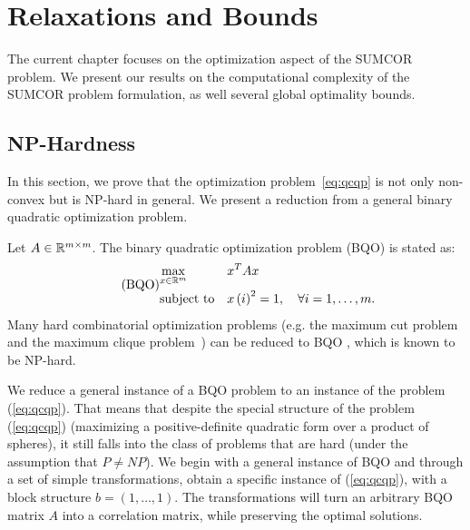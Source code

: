 %
\chapter{Relaxations and Bounds}\label{chap:relaxations}
The current chapter focuses on the optimization aspect of the SUMCOR problem.
We present our results on the computational complexity of the 
SUMCOR problem formulation, as well several global optimality bounds.

\section{NP-Hardness}\label{chap:relaxations:nphard}
In this section, we prove that the optimization problem~\ref{eq:qcqp} is not only
non-convex but is NP-hard in general. We present a reduction from a general binary quadratic
optimization problem.

Let $A \in \mathbb{R}^{m\times m}$.
The binary quadratic optimization problem (BQO) is stated as:
\begin{equation}\label{eq:binqp}
\tag{BQO}
\begin{aligned}
& \underset{x \in \mathbb{R}^m}{\text{max}}
& & x^T A x  \\
& \text{subject to}
& & x\left(i\right)^2 = 1, \quad\forall i =1,\ldots,m.\\
\end{aligned}
\end{equation}
Many hard combinatorial optimization problems (e.g. the
maximum cut  problem and the maximum clique problem~\cite{Garey:1990:CIG:574848}) 
can be reduced to BQO \cite{Goemans95improvedapproximation}, which is known to be NP-hard.

We reduce a general instance of a  BQO problem to an
instance of the problem (\ref{eq:qcqp}). That means that despite the special
structure of the problem (\ref{eq:qcqp}) (maximizing a positive-definite quadratic 
form over a product of spheres), it still falls into the class of problems that 
are hard (under the assumption that $P \neq NP$).
We begin with a general instance of BQO and through a set of simple transformations, obtain a specific
instance of (\ref{eq:qcqp}), with a block structure $b = \left(1,\ldots,1\right)$. 
The transformations will turn an arbitrary BQO matrix $A$ into a correlation 
matrix, while preserving  the optimal solutions.

